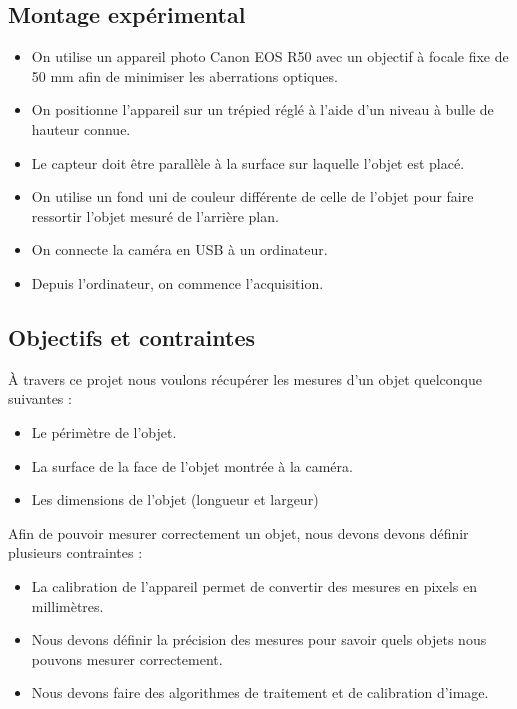 \documentclass[titlepage]{article}
\begin{document}
	\subsection{Montage expérimental} 
		\begin{itemize}
			\item 
			
			On utilise un appareil photo Canon EOS R50 avec un objectif à focale fixe de 50 mm afin de minimiser les aberrations optiques.
			\item
			On positionne l'appareil sur un trépied réglé à l'aide d'un niveau à bulle de hauteur connue.
			\item
			Le capteur doit être parallèle à la surface sur laquelle l'objet est placé.
			\item
			On utilise un fond uni de couleur différente de celle de l'objet pour faire ressortir l'objet mesuré de l'arrière plan.
			\item
			On connecte la caméra en USB à un ordinateur.
			\item
			Depuis l'ordinateur, on commence l'acquisition.
			
			
		\end{itemize}
	\subsection{Objectifs et contraintes} 
	\raggedright
	À travers ce projet nous voulons récupérer les mesures d'un objet quelconque suivantes : 
		\begin{itemize}
			\item 
			Le périmètre de l'objet.
			\item
			La surface de la face de l'objet montrée à la caméra.
			\item
			Les dimensions de l'objet (longueur et largeur)\\[0.5cm]
		\end{itemize}
	Afin de pouvoir mesurer correctement un objet, nous devons devons définir plusieurs contraintes :
		\begin{itemize}
			\item 
			La calibration de l'appareil permet de convertir des mesures en pixels en millimètres.
			\item 
			Nous devons définir la précision des mesures pour savoir quels objets nous pouvons mesurer correctement.
			\item 
			Nous devons faire des algorithmes de traitement et de calibration d'image.
		
		\end{itemize}
\end{document}

